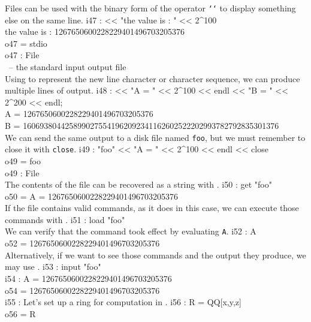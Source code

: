 Files can be used with the binary form
of the operator {\tt \char`\<\char`\<} to display something else on the same
line.
\beginOutput
i47 : << "the value is : " << 2^100\\
the value is : 1267650600228229401496703205376\\
o47 = stdio\\
\emptyLine
o47 : File\\
\emptyLine
\  --  the standard input output file\\
\endOutput
Using  to represent the new line character or character sequence, we can
produce multiple lines of output.
\beginOutput
i48 : << "A = " << 2^100 << endl << "B = " << 2^200 << endl;\\
A = 1267650600228229401496703205376\\
B = 1606938044258990275541962092341162602522202993782792835301376\\
\endOutput
We can send the same output to a disk file named {\tt foo}, but we must remember to
close it with {\tt close}.
\beginOutput
i49 : "foo" << "A = " << 2^100 << endl << close\\
\emptyLine
o49 = foo\\
\emptyLine
o49 : File\\
\endOutput
The contents of the file can be recovered as a string with .
\beginOutput
i50 : get "foo"\\
\emptyLine
o50 = A = 1267650600228229401496703205376\\
\emptyLine
\endOutput
If the file contains valid \Mtwo commands, as it does in this case, we can
execute those commands with .
\beginOutput
i51 : load "foo"\\
\endOutput
We can verify that the command took effect by evaluating {\tt A}.
\beginOutput
i52 : A\\
\emptyLine
o52 = 1267650600228229401496703205376\\
\endOutput
Alternatively, if we want to see those commands and the output they produce,
we may use .
\beginOutput
i53 : input "foo"\\
\emptyLine
i54 : A = 1267650600228229401496703205376\\
\emptyLine
o54 = 1267650600228229401496703205376\\
\emptyLine
i55 : \endOutput
Let's set up a ring for computation in \Mtwo.
\beginOutput
i56 : R = QQ[x,y,z]\\
\emptyLine
o56 = R\\
